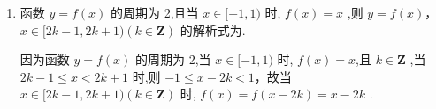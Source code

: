 \begin{enumerate}
\begin{jieda}
         $f\left( {2022}\right)  = f\left( {{505} \times  4 + 2}\right)  = f\left( 2\right)  = 0$
    \end{jieda}

    \item 函数 $y = f\left( x\right)$ 的周期为 2,且当 $x \in  \lbrack  - 1,1)$ 时, $f\left( x\right)  = x$ ,则 $y = f\left( x\right)$，$x \in  \lbrack {2k} - 1,{2k} + 1)\left( {k \in  \mathbf{Z}}\right)$ 的解析式为.
    \begin{jieda}
        因为函数 $y = f\left( x\right)$ 的周期为 2,当 $x \in  \lbrack  - 1,1)$ 时, $f\left( x\right)  = x$,且 $k \in  \mathbf{Z}$ ,当 ${2k} - 1 \leq  x < {2k} + 1$ 时,则 $- 1 \leq  x - {2k} < 1$，故当 $x \in  \lbrack {2k} - 1,{2k} + 1)\left( {k \in  \mathbf{Z}}\right)$ 时, $f\left( x\right)  = f\left( {x - {2k}}\right)  = x - {2k}$ .
    \end{jieda}
    
    
\end{enumerate}
